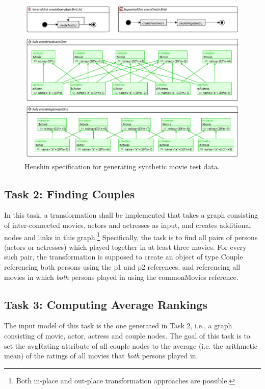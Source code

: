 \documentclass[a4paper,11pt]{article}
\newcommand{\p}[1]{\textsf{\small #1}}
\begin{document}
\begin{figure}[p]
\centering
\includegraphics[scale=1.0,angle=90]{gen-test-data3}
\caption{Henshin specification for generating synthetic movie test data.}
\label{fig:gen-test-data}
\end{figure}

\subsection{Task 2: Finding Couples}

In this task, a transformation shall be implemented that takes a graph
consisting of inter-connected movies, actors and actresses as input, and
creates additional nodes and links in this graph.\footnote{Both in-place and
  out-place transformation approaches are possible.} Specifically, the task is
to find all pairs of persons (actors or actresses) which played together in at
least three movies.  For every such pair, the transformation is supposed to
create an object of type \textsf{Couple} referencing both persons using the
\p{p1} and \p{p2} references, and referencing all movies in which
\emph{both} persons played in using the \p{commonMovies} reference.


\subsection{Task 3: Computing Average Rankings}

The input model of this task is the one generated in Task 2,
i.e., a graph consisting of movie, actor, actress and couple
nodes. The goal of this task is to set the \p{avgRating}-attribute
of all couple nodes to the average (i.e. the
arithmetic mean) of the ratings of all movies that
\emph{both} persons played in.
\end{document}
